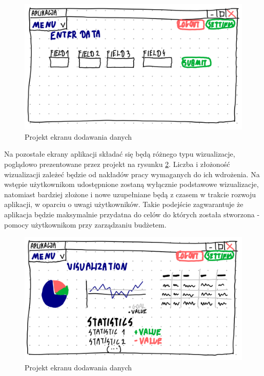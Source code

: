 \documentclass[a4paper, 10pt, twoside, openright]{report}
\begin{document}
\begin{large}
\begin{figure}[H]           %
    \centering
    \includegraphics[width=12cm]{figures/Righten_UI_sketch_adddata.png}
    \caption{Projekt ekranu dodawania danych}
    \label{fig:uiprojectadddata}
\end{figure}

{Na pozostałe ekrany aplikacji składać się będą różnego typu wizualizacje, 
poglądowo prezentowane przez projekt na rysunku 
\ref*{fig:uiprojectvisualizations}. Liczba i złożoność wizualizacji zależeć 
będzie od nakładów pracy wymaganych do ich wdrożenia. Na wstępie użytkownikom 
udostępnione zostaną wyłącznie podstawowe wizualizacje, natomiast bardziej 
złożone i nowe uzupełniane będą z czasem w trakcie rozwoju aplikacji, w oparciu 
o uwagi użytkowników. Takie podejście zagwarantuje że aplikacja będzie 
maksymalnie przydatna do celów do których została stworzona - pomocy 
użytkownikom przy zarządzaniu budżetem.}

\begin{figure}[H]           %
    \centering
    \includegraphics[width=12cm]{figures/Righten_UI_sketch_viusalizations.png}
    \caption{Projekt ekranu dodawania danych}
    \label{fig:uiprojectvisualizations}
\end{figure}


\end{large}
\end{document}

